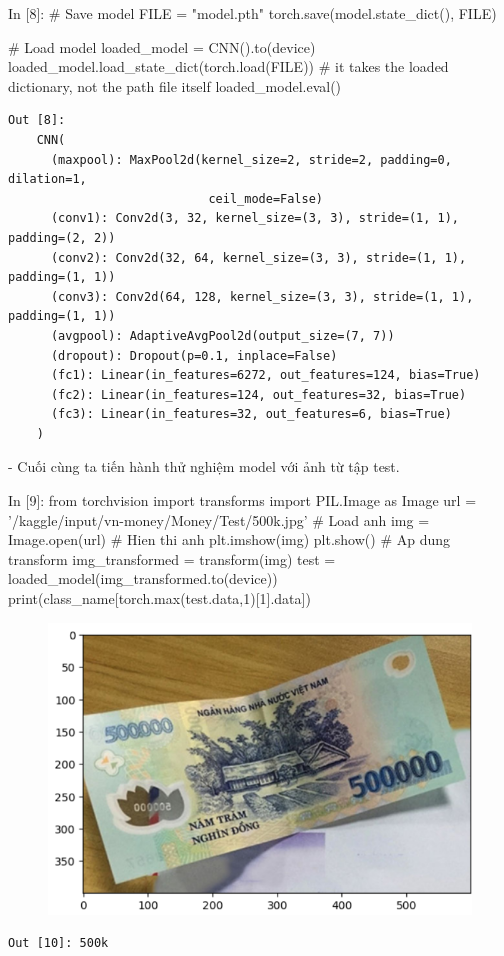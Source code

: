 \documentclass[12pt, a4paper]{article}
\begin{document}
\begin{python}
In [8]: # Save model
        FILE = "model.pth"
        torch.save(model.state_dict(), FILE)
        
        
        # Load model
        loaded_model = CNN().to(device)
        loaded_model.load_state_dict(torch.load(FILE)) # it takes the loaded dictionary, not the path file itself
        loaded_model.eval()
\end{python}
\newpage
\begin{verbatim}
Out [8]:
    CNN(
      (maxpool): MaxPool2d(kernel_size=2, stride=2, padding=0, dilation=1, 
                            ceil_mode=False)
      (conv1): Conv2d(3, 32, kernel_size=(3, 3), stride=(1, 1), padding=(2, 2))
      (conv2): Conv2d(32, 64, kernel_size=(3, 3), stride=(1, 1), padding=(1, 1))
      (conv3): Conv2d(64, 128, kernel_size=(3, 3), stride=(1, 1), padding=(1, 1))
      (avgpool): AdaptiveAvgPool2d(output_size=(7, 7))
      (dropout): Dropout(p=0.1, inplace=False)
      (fc1): Linear(in_features=6272, out_features=124, bias=True)
      (fc2): Linear(in_features=124, out_features=32, bias=True)
      (fc3): Linear(in_features=32, out_features=6, bias=True)
    )
\end{verbatim}
\par - Cuối cùng ta tiến hành thử nghiệm model với ảnh từ tập test.
\begin{python}
In [9]: from torchvision import transforms
        import PIL.Image as Image 
        url = '/kaggle/input/vn-money/Money/Test/500k.jpg'
        # Load anh
        img = Image.open(url)
        # Hien thi anh
        plt.imshow(img)
        plt.show()
        # Ap dung transform
        img_transformed = transform(img)
        test = loaded_model(img_transformed.to(device))
        print(class_name[torch.max(test.data,1)[1].data])
\end{python}


\begin{figure}[h] %
    \includegraphics[scale = 0.8]{Img/Money/P4.png}
\end{figure}
\begin{verbatim}
Out [10]: 500k
\end{verbatim}
\end{document}
